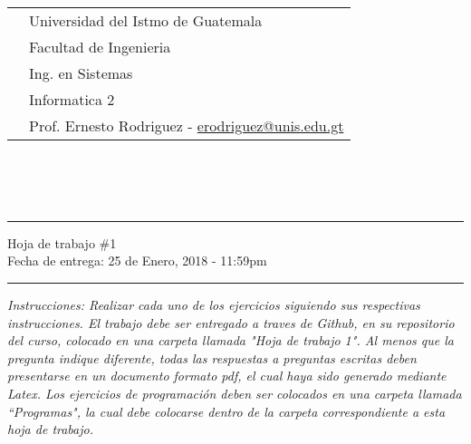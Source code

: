 \documentclass{article}
\newcommand{\horrule}[1]{\rule{\linewidth}{#1}}
\newcommand{\perlscript}[2]{
    \begin{itemize}
    \item[]
    \end{itemize}
    }
\begin{document}
    
    \begin{tabular}{l l}
     & Universidad del Istmo de Guatemala \\
     & Facultad de Ingenieria \\
     & Ing. en Sistemas \\
     & Informatica 2 \\
     & Prof. Ernesto Rodriguez - \href{mailto:erodriguez@unis.edu.gt}{erodriguez@unis.edu.gt} \\
    \end{tabular}
    \\\\\\
    
    \begin{center}
            \horrule{0.5pt}
            \huge{Hoja de trabajo \#1} \\
            \large{Fecha de entrega: 25 de Enero, 2018 - 11:59pm} \\
            \horrule{1pt}
    \end{center}
    
    \emph{Instrucciones: Realizar cada uno de los ejercicios siguiendo sus respectivas
    instrucciones. El trabajo debe ser entregado a traves de Github, en su repositorio del curso, colocado en una carpeta llamada "Hoja de trabajo 1".
    Al menos que la pregunta indique diferente, todas las respuestas a preguntas escritas deben presentarse en
    un documento formato pdf, el cual haya sido generado mediante Latex. Los ejercicios de programaci\'on deben ser colocados en una carpeta
    llamada ``Programas", la cual debe colocarse dentro de la carpeta correspondiente a esta hoja de trabajo.}
    
    
\end{document}
